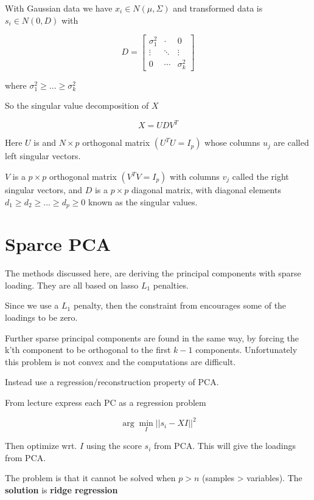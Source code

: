 With Gaussian data we have $x_i \in N(\mu, \Sigma)$ and transformed data is $s_i \in N(0, D)$ with

\[
    D = \left[
    \begin{array}{ccc}
      \sigma^2_1 & \cdot & 0 \\
      \vdots & \ddots & \vdots \\
      0 & \cdots & \sigma^2_k
    \end{array} \right]
\]

where $\sigma^2_1 \geq ... \geq \sigma^2_k$


So the singular value decomposition of $X$

\[
    X = UDV^T
\]

Here $U$ is and $N \times p$ orthogonal matrix $(U^T U = I_p)$ whose columns $u_j$ are called left singular vectors.

$V$ is a $p \times p$ orthogonal matrix $(V^T V = I_p)$ with columns $v_j$ called the right singular vectors, and $D$ is a $p \times p$ diagonal matrix, with diagonal elements $d_1 \geq d_2 \geq ... \geq d_p \geq 0$ known as the singular values.

\section{Sparce PCA}

The methods discussed here, are deriving the principal components with sparse loading. They are all based on lasso $L_1$ penalties.

Since we use a $L_1$ penalty, then the constraint from \cite[p.~550]{friedman2016elements} encourages some of the loadings to be zero.

Further sparse principal components are found in the same way, by forcing the k'th component to be orthogonal to the first $k-1$ components. Unfortunately this problem is not convex and the computations are difficult.

Instead use a regression/reconstruction property of PCA.

From lecture \cite[p.~51]{lecture6} express each PC as a regression problem

\[
    \arg \min\limits_I || s_i - XI ||^2
\]

Then optimize wrt. $I$ using the score $s_i$ from PCA. This will give the loadings from PCA.

The problem is that it cannot be solved when $p > n$ (samples > variables). The \textbf{solution} is \textbf{ridge regression}


